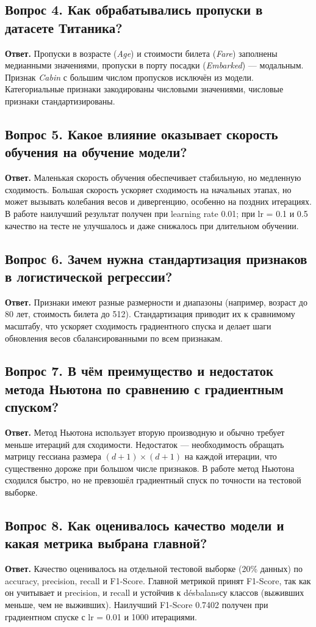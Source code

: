 \documentclass[12pt,a4paper]{article}
\begin{document}
\subsection*{Вопрос 4. Как обрабатывались пропуски в датасете Титаника?}
\textbf{Ответ.} Пропуски в возрасте (\emph{Age}) и стоимости билета (\emph{Fare}) заполнены медианными значениями, пропуски в порту посадки (\emph{Embarked}) --- модальным. Признак \emph{Cabin} с большим числом пропусков исключён из модели. Категориальные признаки закодированы числовыми значениями, числовые признаки стандартизированы.

\subsection*{Вопрос 5. Какое влияние оказывает скорость обучения на обучение модели?}
\textbf{Ответ.} Маленькая скорость обучения обеспечивает стабильную, но медленную сходимость. Большая скорость ускоряет сходимость на начальных этапах, но может вызывать колебания весов и дивергенцию, особенно на поздних итерациях. В работе наилучший результат получен при learning rate 0.01; при lr = 0.1 и 0.5 качество на тесте не улучшалось и даже снижалось при длительном обучении.

\subsection*{Вопрос 6. Зачем нужна стандартизация признаков в логистической регрессии?}
\textbf{Ответ.} Признаки имеют разные размерности и диапазоны (например, возраст до 80 лет, стоимость билета до 512). Стандартизация приводит их к сравнимому масштабу, что ускоряет сходимость градиентного спуска и делает шаги обновления весов сбалансированными по всем признакам.

\subsection*{Вопрос 7. В чём преимущество и недостаток метода Ньютона по сравнению с градиентным спуском?}
\textbf{Ответ.} Метод Ньютона использует вторую производную и обычно требует меньше итераций для сходимости. Недостаток --- необходимость обращать матрицу гессиана размера \((d+1)\times(d+1)\) на каждой итерации, что существенно дороже при большом числе признаков. В работе метод Ньютона сходился быстро, но не превзошёл градиентный спуск по точности на тестовой выборке.

\subsection*{Вопрос 8. Как оценивалось качество модели и какая метрика выбрана главной?}
\textbf{Ответ.} Качество оценивалось на отдельной тестовой выборке (20\% данных) по accuracy, precision, recall и F1-Score. Главной метрикой принят F1-Score, так как он учитывает и precision, и recall и устойчив к désbalansсу классов (выживших меньше, чем не выживших). Наилучший F1-Score 0.7402 получен при градиентном спуске с lr = 0.01 и 1000 итерациями.
\end{document}
